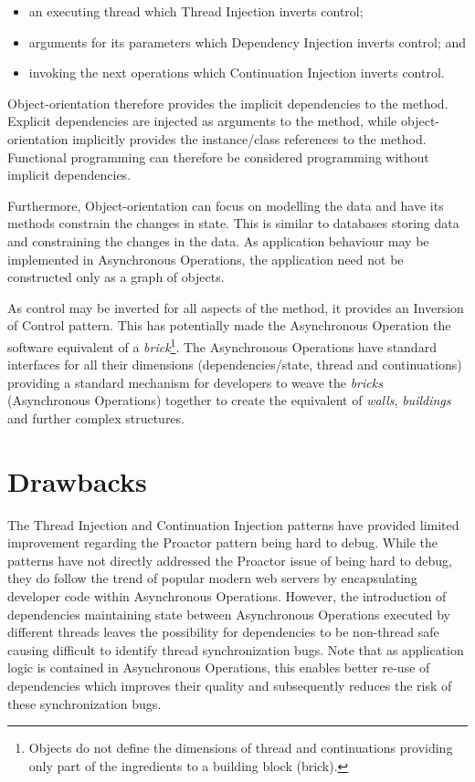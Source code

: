 \documentclass[prodmode]{style/acmlarge}
\begin{document}
\begin{itemize}
  \item an executing thread which Thread Injection inverts control;
  \item arguments for its parameters which Dependency Injection inverts control; and
  \item invoking the next operations which Continuation Injection inverts control.
\end{itemize}

Object-orientation therefore provides the implicit dependencies to the
method.  Explicit dependencies are injected as arguments to the method, while
object-orientation implicitly provides the instance/class references to the
method.  Functional programming can therefore be considered programming without
implicit dependencies.

Furthermore, Object-orientation can focus on modelling the data and have its
methods constrain the changes in state.  This is similar to databases storing
data and constraining the changes in the data.  As application behaviour may be
implemented in Asynchronous Operations, the application need not be constructed
only as a graph of objects.

As control may be inverted for all aspects of the method, it provides an
Inversion of Control pattern.  This has potentially made the Asynchronous
Operation the software equivalent of a \textit{brick}\footnote{Objects do not
define the dimensions of thread and continuations providing only part of the
ingredients to a building block (brick).}.  The Asynchronous Operations have
standard interfaces for all their dimensions (dependencies/state, thread and
continuations) providing a standard mechanism for developers to weave the
\textit{bricks} (Asynchronous Operations) together to create the equivalent of
\textit{walls}, \textit{buildings} and further complex structures.


\section{Drawbacks}

The Thread Injection and Continuation Injection patterns have provided limited
improvement regarding the Proactor pattern being hard to debug.  While the
patterns have not directly addressed the Proactor issue of being hard to debug,
they do follow the trend of popular modern web servers by encapsulating
developer code within Asynchronous Operations.  However, the introduction of
dependencies maintaining state between Asynchronous Operations executed by
different threads leaves the possibility for dependencies to be non-thread safe
causing difficult to identify thread synchronization bugs.  Note that as
application logic is contained in Asynchronous Operations, this enables better
re-use of dependencies which improves their quality and subsequently reduces the
risk of these synchronization bugs.
\end{document}
